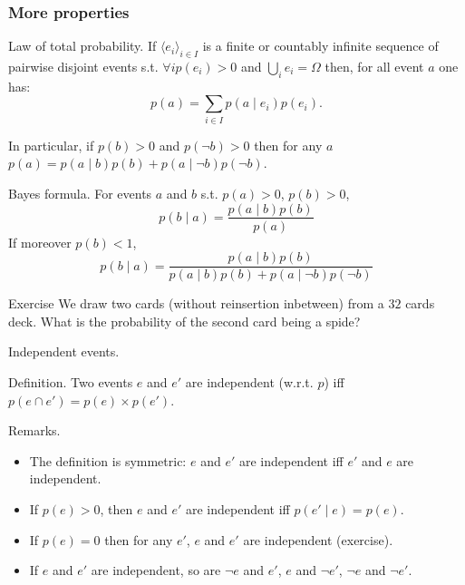 \documentclass{beamer}
\begin{document}
\begin{frame}
  \frametitle{More properties}

  \begin{block}{Law of total probability.}
    If $\langle e_i \rangle_{i \in I}$ is a finite or countably infinite sequence of pairwise disjoint events s.t. $\forall i p(e_i) > 0$ and $\bigcup_i e_i = \Omega$ then, for all event $a$ one has:
    \[p(a) = \sum_{i \in I} p(a \mid e_i)p(e_i).\]
  \end{block}
  
  In particular, if $p(b) > 0$ and $p(\neg b) > 0$ then for any $a$ $p(a) = p(a \mid b)p(b) + p(a \mid \neg b)p(\neg b)$.
\end{frame}

\begin{frame}{Bayes formula.}
  For events $a$ and $b$ s.t. $p(a) > 0$, $p(b) > 0$,
  \[p(b \mid a) = \frac{p(a \mid b)p(b)}{p(a)}\]
  If moreover $p(b) < 1$,
  \[p(b \mid a) = \frac{p(a \mid b)p(b)}{p(a \mid b)p(b) + p(a \mid \neg b)p(\neg b)}\]
\end{frame}

\begin{frame}{Exercise}
  We draw two cards (without reinsertion inbetween) from a $32$ cards deck. What is the probability of the second card being a spide?
\end{frame}

\begin{frame}{Independent events.}
  \begin{block}{Definition.}
    Two events $e$ and $e'$ are independent (w.r.t. $p$) iff $p(e \cap e') = p(e) \times p(e')$.
  \end{block}

  \begin{block}{Remarks.}
    \begin{itemize}
    \item The definition is symmetric: $e$ and $e'$ are independent iff $e'$ and $e$ are independent.
    \item If $p(e) > 0$, then $e$ and $e'$ are independent iff $p(e' \mid e) = p(e)$.
    \item If $p(e) = 0$ then for any $e'$, $e$ and $e'$ are independent (exercise).
    \item If $e$ and $e'$ are independent, so are $\neg e$ and $e'$, $e$ and $\neg e'$, $\neg e$ and $\neg e'$. 
    \end{itemize}
  \end{block}
\end{frame}
\end{document}
